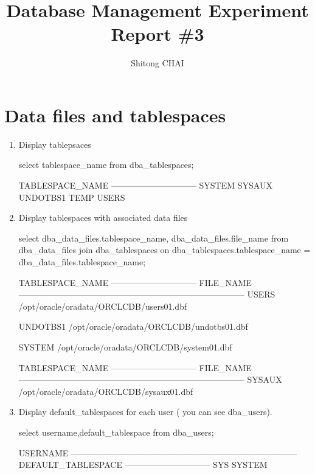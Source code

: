 \documentclass{article}
\title{Database Management Experiment Report \#3}
\author{Shitong CHAI}
\date{\vspace{-5ex}}
\begin{document}
\maketitle

\section{Data files and tablespaces}


\begin{enumerate}
\item{Display tablepsaces}
\begin{sqlshell}
select tablespace_name from dba_tablespaces;
\end{sqlshell}
\begin{messageshell}
TABLESPACE_NAME
------------------------------
SYSTEM
SYSAUX
UNDOTBS1
TEMP
USERS

\end{messageshell}

\item{Display tablespaces with associated data files}
\begin{sqlshell}
select dba_data_files.tablespace_name, dba_data_files.file_name from dba_data_files join dba_tablespaces on dba_tablespaces.tablespace_name = dba_data_files.tablespace_name;
\end{sqlshell}
\begin{messageshell}

TABLESPACE_NAME
------------------------------
FILE_NAME
--------------------------------------------------------------------------------
USERS
/opt/oracle/oradata/ORCLCDB/users01.dbf

UNDOTBS1
/opt/oracle/oradata/ORCLCDB/undotbs01.dbf

SYSTEM
/opt/oracle/oradata/ORCLCDB/system01.dbf


TABLESPACE_NAME
------------------------------
FILE_NAME
--------------------------------------------------------------------------------
SYSAUX
/opt/oracle/oradata/ORCLCDB/sysaux01.dbf

\end{messageshell}

\item{Display default\_tablespaces for each user ( you can see dba\_users).}
\begin{sqlshell}
select username,default_tablespace from dba_users;
\end{sqlshell}
\begin{messageshell}
USERNAME
--------------------------------------------------------------------------------
DEFAULT_TABLESPACE
------------------------------
SYS
SYSTEM


\end{messageshell}
\end{enumerate}
\end{document}
